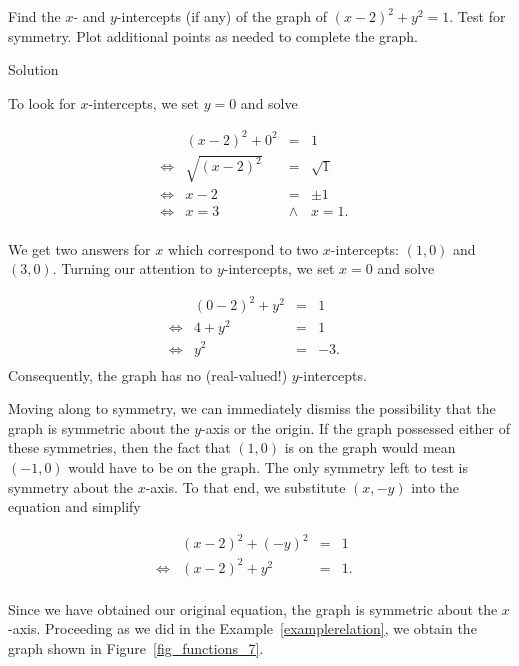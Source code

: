 \begin{example}
 Find the $x$- and $y$-intercepts (if any) of the graph of $(x-2)^2 + y^2 = 1$. Test for symmetry.  Plot additional points as needed to complete the graph.

Solution 

To look for $x$-intercepts, we set $y=0$ and solve

\[ \begin{array}{rrclr}   

&(x-2)^2 + 0^2 & = & 1 & \\ 
\Leftrightarrow &\sqrt{(x-2)^2} & = & \sqrt{1} & \\
\Leftrightarrow &x - 2 & = & \pm 1 & \\
\Leftrightarrow &x  = 3 & \wedge & x  =  1. & \\

\end{array} \]

We get two answers for $x$ which correspond to two $x$-intercepts:  $(1,0)$ and $(3,0)$.    Turning our attention to $y$-intercepts, we set $x=0$ and solve

\[ \begin{array}{rrclr}   

&(0-2)^2 + y^2 & = & 1 & \\ 
\Leftrightarrow&4 + y^2 & = & 1 & \\
\Leftrightarrow&y^2 & = & -3. & \\

\end{array} \]
Consequently, the graph has no (real-valued!) $y$-intercepts.


Moving along to symmetry, we can immediately dismiss the possibility that the graph is symmetric about the $y$-axis or the origin.  If the graph possessed either of these symmetries, then the fact that $(1,0)$ is on the graph would mean $(-1,0)$ would have to be on the graph. The only symmetry left to test is symmetry about the $x$-axis.   To that end, we substitute $(x,-y)$ into the equation and simplify

\[ \begin{array}{rrclr}   
&(x-2)^2 + (-y)^2 & = & 1 & \\ 
\Leftrightarrow&(x-2)^2 + y^2 & = & 1 .& \\
\end{array} \]

Since we have obtained our original equation, the graph is symmetric about the $x$-axis. Proceeding as we did in the Example~\ref{examplerelation}, we obtain the graph shown in Figure~\ref{fig_functions_7}.



\end{example}
